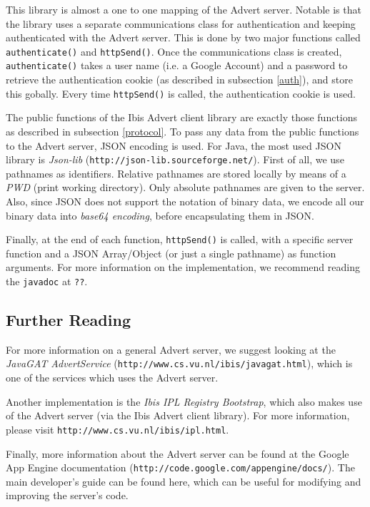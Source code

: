 This library is almost a one to one mapping of the Advert server. Notable is
that the library uses a separate communications class for authentication and
keeping authenticated with the Advert server. This is done by two major
functions called \texttt{authenticate()} and \texttt{httpSend()}. Once the
communications class is created,  \texttt{authenticate()} takes a user name
(i.e. a Google Account) and a password to retrieve the authentication cookie
(as described in subsection \ref{auth}), and store this gobally. Every time
\texttt{httpSend()} is called, the authentication cookie is used.

The public functions of the Ibis Advert client library are exactly those
functions as described in subsection \ref{protocol}. To pass any data from the public functions
to the Advert server, JSON encoding is used. For Java, the most used JSON
library is \emph{Json-lib} (\texttt{http://json-lib.sourceforge.net/}). First
of all, we use pathnames as identifiers. Relative pathnames are stored
locally by means of a \emph{PWD} (print working directory). Only absolute
pathnames are given to the server. Also, since JSON does not support the
notation of binary data, we encode all our binary data into \emph{base64
encoding}, before encapsulating them in JSON. 

Finally, at the end of each function, \texttt{httpSend()} is called, with a
specific server function and a JSON Array/Object (or just a single pathname) as
function arguments. For more information on the implementation, we recommend
reading the \texttt{javadoc} at \texttt{??}. %
 
\subsection{Further Reading}
\label{further}
For more information on a general Advert server, we suggest looking at the
\emph{JavaGAT AdvertService} (\texttt{http://www.cs.vu.nl/ibis/javagat.html}),
which is one of the services which uses the Advert server.

Another implementation is the \emph{Ibis IPL Registry Bootstrap}, which also
makes use of the Advert server (via the Ibis Advert client library). For more
information, please visit \texttt{http://www.cs.vu.nl/ibis/ipl.html}.

Finally, more information about the Advert server can be found at the Google
App Engine documentation (\texttt{http://code.google.com/appengine/docs/}). The
main developer's guide can be found here, which can be useful for modifying and
improving the server's code.
